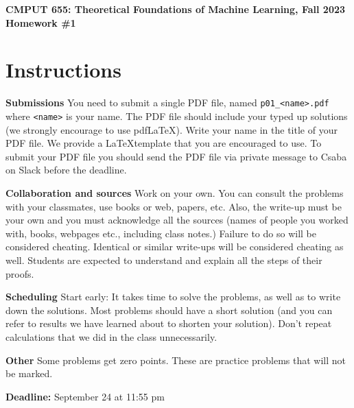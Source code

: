 \documentclass{article}
\newcommand{\hwnumber}{1}
\DeclareMathOperator*{\1}{\mathbbm{1}}
\theoremstyle{definition}
\theoremstyle{remark}
\begin{document}
\begin{center}
{\Large \textbf{CMPUT 655: Theoretical Foundations of Machine Learning, Fall 2023\\ Homework \#\hwnumber}}
\end{center}

\section*{Instructions}
\textbf{Submissions}
You need to submit a single PDF file, named {\tt p0\hwnumber\_<name>.pdf} where {\tt <name>} is your name.
The PDF file should include your typed up solutions (we strongly encourage to use pdf\LaTeX). 
Write your name in the title of your PDF file.
We provide a \LaTeX template that you are encouraged to use.
To submit your PDF file you should send the PDF file via private message to Csaba on Slack before the deadline.


\textbf{Collaboration and sources}
Work on your own. You can consult the problems with your classmates, use books
or web, papers, etc.
Also, the write-up must be your own and you must acknowledge all the
sources (names of people you worked with, books, webpages etc., including class notes.) 
Failure to do so will be considered cheating.  
Identical or similar write-ups will be considered cheating as well.
Students are expected to understand and explain all the steps of their proofs.

\textbf{Scheduling}
Start early: It takes time to solve the problems, as well as to write down the solutions. Most problems should have a short solution (and you can refer to results we have learned about to shorten your solution). Don't repeat calculations that we did in the class unnecessarily.

\textbf{Other}
Some problems get zero points. These are practice problems that will not be marked.

\vspace{0.3cm}

\textbf{Deadline:} September 24 at 11:55 pm

\newcommand{\cM}{\mathcal{M}}
\newcommand{\nS}{\mathrm{S}}
\newcommand{\nA}{\mathrm{A}}
\newcommand{\PP}{\mathbb{P}}
\newcommand{\RR}{\mathbb{R}}
\newcommand{\cX}{\mathcal{X}}
\newcommand{\cY}{\mathcal{Y}}
\newcommand{\cZ}{\mathcal{Z}}
\newcommand{\cD}{\mathcal{D}}
\newcommand{\cN}{\mathcal{N}}
\newcommand{\ip}[1]{\langle #1 \rangle}
\newcommand{\one}[1]{\mathbb{I}\{#1\}}
\newcommand{\KL}{\mathrm{KL}}
\end{document}
